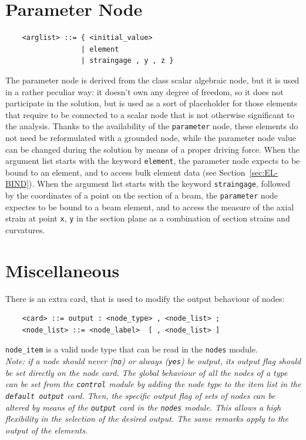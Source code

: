 \documentclass[10pt,dvips]{report}
\begin{document}
\section{Parameter Node}
\begin{verbatim}
    <arglist> ::= { <initial_value>
                  | element 
                  | straingage , y , z }
\end{verbatim}
The parameter node is derived from the class scalar algebraic node, but it
is used in a rather peculiar way: it doesn't own any degree of freedom,
so it does not participate in the solution, but is used as a sort of
placeholder for those elements that require to be connected to a scalar node
that is not otherwise significant to the analysis.
Thanks to the availability of the {\tt parameter} node, these elements
do not need be reformulated with a grounded node, while the parameter
node value can be changed during the solution by means of a proper driving 
force.
When the argument list starts with the keyword {\tt element}, the parameter
node expects to be bound to an element, and to access bulk element data 
(see Section~\ref{sec:EL-BIND}).
When the argument list starts with the keyword {\tt straingage}, followed by
the coordinates of a point on the section of a beam, the {\tt parameter}
node expectes to be bound to a beam element, and to access the measure of
the axial strain at point {\tt x}, {\tt y} in the section plane as a
combination of section strains and curvatures.





\section{Miscellaneous}
There is an extra card, that is used to modify the output behaviour of nodes:  
\begin{verbatim}
    <card> ::= output : <node_type> , <node_list> ;
    <node_list> ::= <node_label>  [ , <node_list> ]
\end{verbatim}
{\tt node\_item} is a valid node type that can be read in the {\tt nodes}
module. \\
{\em
   Note: if a node should never ({\tt no}) or always ({\tt yes}) be output,
   its output flag should be set directly on the node card. 
   The global behaviour of all the nodes of a type can be set from the 
   {\tt control} module by adding the node type to the item list in the 
   {\tt default output} card. 
   Then, the specific output flag of sets of nodes can be altered by means 
   of the {\tt output} card in the {\tt nodes} module. 
   This allows a high flexibility in the selection of the desired output. 
   The same remarks apply to the output of the elements.
}
\end{document}
